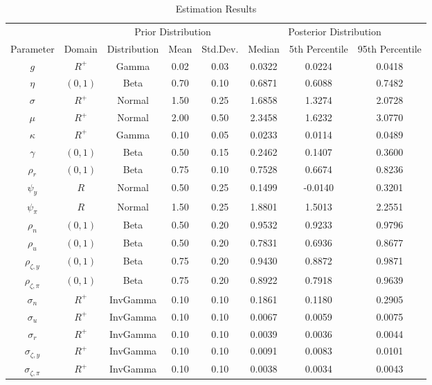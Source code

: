 \documentclass[10pt]{article}
\begin{document}
{\begin{table}
\centering
\caption{Estimation Results}\label{tb:parmsest}
\begin{center}
\begin{tabular}{c|c||c|cc||c|cc} \hline
\multicolumn{2}{c}{} & \multicolumn{3}{c}{Prior Distribution} & \multicolumn{3}{c}{Posterior Distribution} \\ 
Parameter & Domain & Distribution & Mean & Std.Dev. & Median & 5th Percentile & 95th Percentile \\ \hline 
$g$ & $R^{+}$ & Gamma & 0.02 & 0.03 & 0.0322 & 0.0224 & 0.0418 \\ 
$\eta$ & $(0,1)$ & Beta & 0.70 & 0.10 & 0.6871 & 0.6088 & 0.7482 \\ 
$\sigma$ & $R^{+}$ & Normal & 1.50 & 0.25 & 1.6858 & 1.3274 & 2.0728 \\ 
$\mu$ & $R^{+}$ & Normal & 2.00 & 0.50 & 2.3458 & 1.6232 & 3.0770 \\ 
$\kappa$ & $R^{+}$ & Gamma & 0.10 & 0.05 & 0.0233 & 0.0114 & 0.0489 \\ 
$\gamma$ & $(0,1)$ & Beta & 0.50 & 0.15 & 0.2462 & 0.1407 & 0.3600 \\ 
$\rho_r$ & $(0,1)$ & Beta & 0.75 & 0.10 & 0.7528 & 0.6674 & 0.8236 \\ 
$\psi_y$ & $R$ & Normal & 0.50 & 0.25 & 0.1499 & -0.0140 & 0.3201 \\ 
$\psi_{\pi}$ & $R$ & Normal & 1.50 & 0.25 & 1.8801 & 1.5013 & 2.2551 \\ 
$\rho_n$ & $(0,1)$ & Beta & 0.50 & 0.20 & 0.9532 & 0.9233 & 0.9796 \\ 
$\rho_u$ & $(0,1)$ & Beta & 0.50 & 0.20 & 0.7831 & 0.6936 & 0.8677 \\ 
$\rho_{\zeta,y}$ & $(0,1)$ & Beta & 0.75 & 0.20 & 0.9430 & 0.8872 & 0.9871 \\ 
$\rho_{\zeta,\pi}$ & $(0,1)$ & Beta & 0.75 & 0.20 & 0.8922 & 0.7918 & 0.9639 \\ 
$\sigma_{n}$ & $R^{+}$ & InvGamma & 0.10 & 0.10 & 0.1861 & 0.1180 & 0.2905 \\ 
$\sigma_{u}$ & $R^{+}$ & InvGamma & 0.10 & 0.10 & 0.0067 & 0.0059 & 0.0075 \\ 
$\sigma_{r}$ & $R^{+}$ & InvGamma & 0.10 & 0.10 & 0.0039 & 0.0036 & 0.0044 \\ 
$\sigma_{\zeta,y}$ & $R^{+}$ & InvGamma & 0.10 & 0.10 & 0.0091 & 0.0083 & 0.0101 \\ 
$\sigma_{\zeta,\pi}$ & $R^{+}$ & InvGamma & 0.10 & 0.10 & 0.0038 & 0.0034 & 0.0043 \\ 

\end{tabular}
\end{center}
\end{table}}
\end{document}
